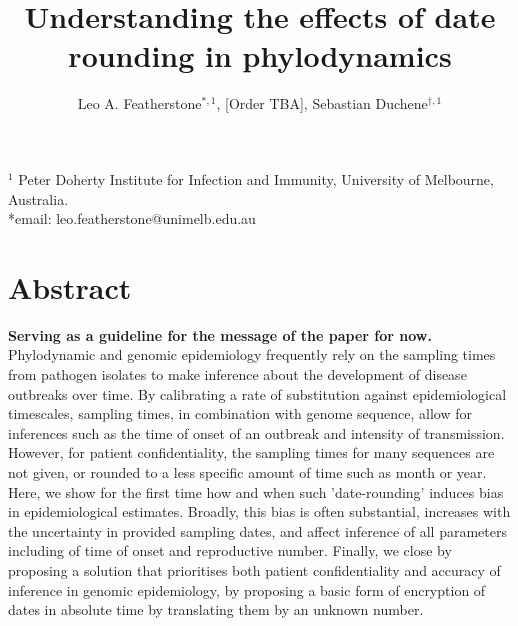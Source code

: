 \documentclass{article}
\title{Understanding the effects of date rounding in phylodynamics}
\author{Leo A. Featherstone$^{\ast,1}$, [Order TBA], Sebastian Duchene$^{\dagger,1}$}
\begin{document}
\maketitle
\linenumbers
$^{1}$ Peter Doherty Institute for Infection and Immunity, University of Melbourne, Australia.\\
*email: leo.featherstone@unimelb.edu.au

\section*{Abstract}
\textbf{Serving as a guideline for the message of the paper for now.}
Phylodynamic and genomic epidemiology frequently rely on the sampling times from pathogen isolates to make inference about the development of disease outbreaks over time. By calibrating a rate of substitution against epidemiological timescales, sampling times, in combination with genome sequence, allow for inferences such as the time of onset of an outbreak and intensity of transmission. However, for patient confidentiality, the sampling times for many sequences are not given, or rounded to a less specific amount of time such as month or year. Here, we show for the first time how and when such 'date-rounding' induces bias in epidemiological estimates. Broadly, this bias is often substantial, increases with the uncertainty in provided sampling dates, and affect inference of all parameters including of time of onset and reproductive number. Finally, we close by proposing a solution that prioritises both patient confidentiality and accuracy of inference in genomic epidemiology, by proposing a basic form of encryption of dates in absolute time by translating them by an unknown number.
\end{document}
